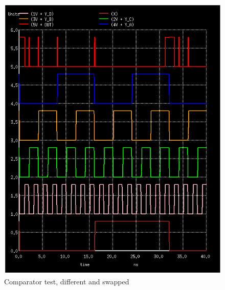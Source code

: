 \documentclass[12pt]{report}
\begin{document}
\begin{figure}[H]
  \centering
    \includegraphics[width=1.0\textwidth]{comparator_test_diff_swapped.PNG}
  \caption{Comparator test, different and swapped}
  \label{fig:comparator_test_diff_swapped}
\end{figure}
\end{document}

